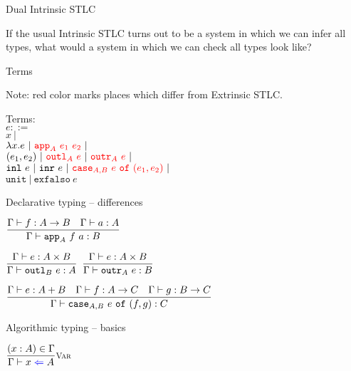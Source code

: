\documentclass{beamer}
\newcommand{\pipe}{\ |\ }
\newcommand{\Fun}[2]{#1 \to #2}
\newcommand{\Prod}[2]{#1 \times #2}
\newcommand{\Sum}[2]{#1 + #2}
\newcommand{\fun}[2]{\lambda #1. #2}
\newcommand{\pair}[2]{(#1, #2)}
\newcommand{\inl}[1]{\texttt{inl}\ #1}
\newcommand{\inr}[1]{\texttt{inr}\ #1}
\newcommand{\unit}{\texttt{unit}}
\newcommand{\exfalso}[1]{\texttt{exfalso}\ #1}
\newcommand{\fulltyping}[3]{#1 \vdash #2 : #3}
\newcommand{\typing}[2]{\fulltyping{\Gamma}{#1}{#2}}
\newcommand{\rulename}[1]{\textsc{\footnotesize{#1}}}
\newcommand{\infrule}[3][]{\displaystyle \frac{#2}{#3} \rulename{#1}}
\newcommand{\sidecond}[1]{#1}
\begin{document}
\begin{frame}{Dual Intrinsic STLC}

If the usual Intrinsic STLC turns out to be a system in which we can infer all types, what would a system in which we can check all types look like?

\end{frame}

\begin{frame}{Terms}

Note: red color marks places which differ from Extrinsic STLC.

\vspace{2em}

Terms: \\
$e ::=$ \\
\qquad $x \pipe$ \\
\qquad $\fun{x}{e} \pipe \termdiff{\iapp{A}{e_1}{e_2}} \pipe$ \\
\qquad $\pair{e_1}{e_2} \pipe \termdiff{\ioutl{A}{e}} \pipe \termdiff{\ioutr{A}{e}} \pipe$ \\
\qquad $\inl{e} \pipe \inr{e} \pipe \termdiff{\icase{A}{B}{e}{e_1}{e_2}} \pipe$ \\
\qquad $\unit \pipe \exfalso{e}$

\end{frame}

\begin{frame}{Declarative typing -- differences}

\begin{center}
  $\infrule{\typing{f}{\Fun{A}{B}} \quad \typing{a}{A}}{\typing{\iapp{A}{f}{a}}{B}}$

  \vspace{2em}

  $\infrule{\typing{e}{\Prod{A}{B}}}{\typing{\ioutl{B}{e}}{A}}$ \quad
  $\infrule{\typing{e}{\Prod{A}{B}}}{\typing{\ioutr{A}{e}}{B}}$ \quad

  \vspace{2em}

  $\infrule{\typing{e}{\Sum{A}{B}} \quad \typing{f}{\Fun{A}{C}} \quad \typing{g}{\Fun{B}{C}}}{\typing{\icase{A}{B}{e}{f}{g}}{C}}$
\end{center}

\end{frame}

\begin{frame}{Algorithmic typing -- basics}

\begin{center}
  $\infrule[Var]{\sidecond{(x : A) \in \Gamma}}{\check{x}{A}}$
\end{center}

\end{frame}
\end{document}
